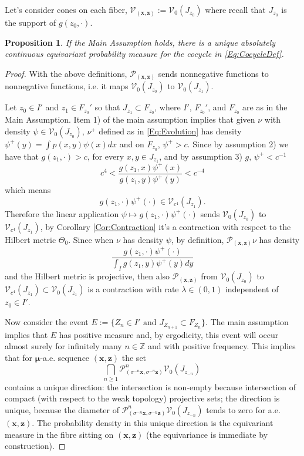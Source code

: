 \documentclass{article}
\newcommand{\1}{\mathbbm{1}}
\newcommand{\bo}{\boldsymbol}
\newcommand{\Z}{\mathbb Z}
\newcommand{\mc}{\mathcal}
\newtheorem{proposition}[theorem]{Proposition}
\begin{document}
Let's consider cones on each fiber, $\mc V_{(\bo x,\bo z)}:=\mc V_0(J_{z_0})$ where recall that $J_{z_0}$ is the support of $g(z_0,\cdot)$.
\begin{proposition}
If the Main Assumption holds, there is a unique absolutely continuous equivariant probability measure for the cocycle in \eqref{Eq:CocycleDef}.
\end{proposition}
\begin{proof}
 With the above definitions, $\mc P_{(\bo x, \bo z)}$ sends nonnegative functions to nonnegative functions, i.e. it maps $\mc V_0(J_{z_0}) $ to $\mc V_0(J_{z_1})$.

Let $z_0\in I'$ and $z_1\in F_{z_0}'$ so that $J_{z_{1}}\subset F_{z_0}$, where $I'$, $F_{z_0}'$, and $F_{z_0}$ are as in the Main Assumption. Item 1) of the main assumption implies that given $\nu$ with density $\psi\in \mc V_0(J_{z_0})$, $\nu^+$ defined as in \eqref{Eq:Evolution} has density $\psi^+(y)=\int p(x,y)\psi(x)dx$ and  on $F_{z_{0}}$, $\psi^+>c$.  Since by assumption 2) we have that $g(z_{1},\cdot)>c$, for every $x,y\in J_{z_1}$, and by assumption 3) $g,\,\psi^+<c^{-1}$
\[
c^4<\frac{g(z_{1},x)\psi^+(x)}{g(z_{1},y)\psi^+(y)} < c^{-4}
\]
which means
\[
g(z_{1},\cdot)\psi^+(\cdot)\in \mc V_{c^4}(J_{z_1}).
\]
Therefore the linear application $\psi\mapsto g(z_{1},\cdot)\psi^+(\cdot)$ sends $\mc V_0(J_{z_0})$ to $\mc V_{c^4}(J_{z_{1}})$, by Corollary \ref{Cor:Contraction} it's a contraction with respect to the Hilbert metric $\Theta_0$. Since when $\nu$ has density $\psi$, by definition, $\mc P_{(\bo x,\bo z)}\nu$ has density
\[
\frac{g(z_{1},\cdot)\psi^+(\cdot)}{\int_Ig(z_{1},y)\psi^+(y)dy}
\]
and the Hilbert metric is projective, then also $\mc P_{(\bo x,\bo z )}$ from $\mc V_0(J_{z_0})$ to  $\mc V_{c^4}(J_{z_1})\subset\mc V_{0}(J_{z_1})$ is a contraction with rate $\lambda\in(0,1)$ independent of $z_0\in I'$.

Now consider the event $E:=\{Z_n\in I' \mbox{ and } J_{Z_{n+1}}\subset F_{Z_n} \}$. The main assumption implies that $E$ has positive measure and, by ergodicity, this event will occur almost surely for infinitely many $n\in \Z$ and with positive frequency.  This implies that for $\bo \mu$-a.e. sequence $(\bo x, \bo z)$ the set
\[
\bigcap_{n\ge 1} \mc P^n_{(\sigma^{-n}\bo x,\sigma^{-n}\bo z)} \mc V_0(J_{z_{-n}})\
\]
contains a unique direction: the intersection is non-empty because intersection of compact (with respect to the weak topology) projective sets; the direction is unique, because the diameter of $\mc P^n_{(\sigma^{-n}\bo x,\sigma^{-n}\bo z)} \mc V_0(J_{z_{-n}})$ tends to zero for a.e. $(\bo x, \bo z)$. The probability density in this unique direction is the equivariant measure in the fibre sitting on $(\bo x, \bo z)$ (the equivariance is immediate by construction).
\end{proof}
\end{document}
